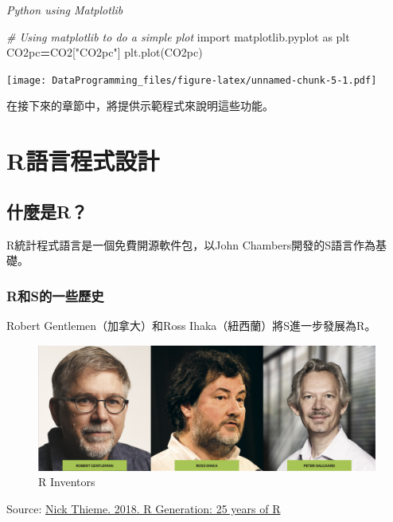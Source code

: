 \documentclass[]{book}
\newenvironment{Shaded}{\begin{snugshade}}{\end{snugshade}}
\newcommand{\CommentTok}[1]{\textcolor[rgb]{0.56,0.35,0.01}{\textit{#1}}}
\newcommand{\ImportTok}[1]{#1}
\newcommand{\NormalTok}[1]{#1}
\newcommand{\OperatorTok}[1]{\textcolor[rgb]{0.81,0.36,0.00}{\textbf{#1}}}
\newcommand{\StringTok}[1]{\textcolor[rgb]{0.31,0.60,0.02}{#1}}
\begin{document}
\emph{Python using Matplotlib}

\begin{Shaded}
\begin{Highlighting}[]
\CommentTok{# Using matplotlib to do a simple plot}
\ImportTok{import}\NormalTok{ matplotlib.pyplot }\ImportTok{as}\NormalTok{ plt}
\NormalTok{CO2pc}\OperatorTok{=}\NormalTok{CO2[}\StringTok{"CO2pc"}\NormalTok{]}
\NormalTok{plt.plot(CO2pc)}
\end{Highlighting}
\end{Shaded}

\texttt{[image: DataProgramming\_files/figure-latex/unnamed-chunk-5-1.pdf]}

在接下來的章節中，將提供示範程式來說明這些功能。

\hypertarget{r}{%
\chapter{R語言程式設計}\label{r}}

\hypertarget{r-1}{%
\section{什麼是R？}\label{r-1}}

R統計程式語言是一個免費開源軟件包，以John Chambers開發的S語言作為基礎。

\hypertarget{rs}{%
\subsection{R和S的一些歷史}\label{rs}}

Robert Gentlemen（加拿大）和Ross Ihaka（紐西蘭）將S進一步發展為R。

\begin{figure}
\includegraphics[width=1\linewidth]{Rinventors} \caption{R Inventors}\label{fig:Rinventors}
\end{figure}

Source: \href{https://rss.onlinelibrary.wiley.com/doi/10.1111/j.1740-9713.2018.01169.x}{Nick Thieme. 2018. R Generation: 25 years of R}
\end{document}
